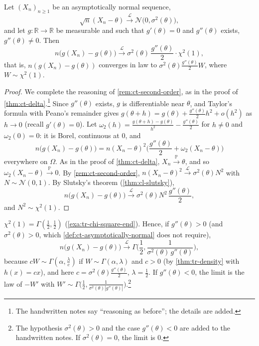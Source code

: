 \begin{theorem}\label{thm:ct-delta-second-order}
Let $(X_n)_{n\ge1}$ be an asymptotically normal sequence,
\[
  \sqrt n(X_n-\theta)\xrightarrow{\mathcal L}\mathcal N\big(0,\sigma^2(\theta)\big),
\]
and let $g:\mathbb R\to\mathbb R$ be measurable and such that $g'(\theta)=0$ and $g''(\theta)$
exists, $g''(\theta)\ne0$. Then
\[
  n\big(g(X_n)-g(\theta)\big)\xrightarrow{\mathcal L}\sigma^2(\theta)\,\frac{g''(\theta)}2\cdot\chi^2(1),
\]
that is, $n(g(X_n)-g(\theta))$ converges in law to $\sigma^2(\theta)\frac{g''(\theta)}2W$, where
$W\sim\chi^2(1)$.
\end{theorem}

\begin{proof}
We complete the reasoning of \cref{rem:ct-second-order}, as in the proof of
\cref{thm:ct-delta}.\footnote{The handwritten notes say ``reasoning as before''; the details are
added.} Since $g''(\theta)$ exists, $g$ is differentiable near $\theta$, and Taylor's formula with
Peano's remainder gives $g(\theta+h)=g(\theta)+\frac{g''(\theta)}2h^2+o(h^2)$ as $h\to0$
(recall $g'(\theta)=0$). Let $\omega_2(h)=\frac{g(\theta+h)-g(\theta)}{h^2}-\frac{g''(\theta)}2$ for
$h\ne0$ and $\omega_2(0)=0$: it is Borel, continuous at $0$, and
\[
  n\big(g(X_n)-g(\theta)\big)=n(X_n-\theta)^2\Big(\frac{g''(\theta)}2+\omega_2(X_n-\theta)\Big)
\]
everywhere on $\Omega$. As in the proof of \cref{thm:ct-delta}, $X_n\xrightarrow{\mathbb P}\theta$,
and so $\omega_2(X_n-\theta)\xrightarrow{\mathbb P}0$. By \cref{rem:ct-second-order},
$n(X_n-\theta)^2\xrightarrow{\mathcal L}\sigma^2(\theta)N^2$ with $N\sim\mathcal N(0,1)$. By Slutsky's
theorem (\cref{thm:cl-slutsky}),
\[
  n\big(g(X_n)-g(\theta)\big)\xrightarrow{\mathcal L}\sigma^2(\theta)N^2\,\frac{g''(\theta)}2,
\]
and $N^2\sim\chi^2(1)$.
\end{proof}

\begin{remark}\label{rem:ct-gamma}
$\chi^2(1)=\Gamma(\frac12,\frac12)$ (\cref{exa:tr-chi-square-end}). Hence, if $g''(\theta)>0$ (and
$\sigma^2(\theta)>0$, which \cref{def:ct-asymptotically-normal} does not require),
\[
  n\big(g(X_n)-g(\theta)\big)\xrightarrow{\mathcal L}\Gamma\Big(\frac12,\frac1{\sigma^2(\theta)\,g''(\theta)}\Big),
\]
because $cW\sim\Gamma(\alpha,\frac\lambda c)$ if $W\sim\Gamma(\alpha,\lambda)$ and $c>0$ (by
\cref{thm:tr-density} with $h(x)=cx$), and here $c=\sigma^2(\theta)\frac{g''(\theta)}2$,
$\lambda=\frac12$. If $g''(\theta)<0$, the limit is the law of $-W'$ with
$W'\sim\Gamma\big(\frac12,\frac1{\sigma^2(\theta)|g''(\theta)|}\big)$.\footnote{The hypothesis $\sigma^2(\theta)>0$ and the case
$g''(\theta)<0$ are added to the handwritten notes. If $\sigma^2(\theta)=0$, the limit is $0$.}
\end{remark}

